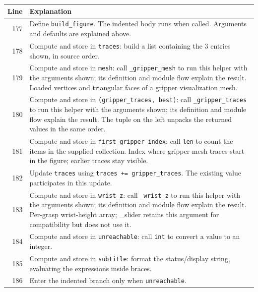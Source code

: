 \documentclass[11pt,a4paper]{book}
\begin{document}
\begin{longtable}{r p{}}

\textbf{Line} & \textbf{Explanation} \\ \hline \endhead

177 & Define \texttt{build\_figure}. The indented body runs when called. Arguments and defaults are explained above. \\

178 & Compute and store in \texttt{traces}: build a list containing the 3 entries shown, in source order.  \\

179 & Compute and store in \texttt{mesh}: call \texttt{\_gripper\_mesh} to run this helper with the arguments shown; its definition and module flow explain the result. Loaded vertices and triangular faces of a gripper visualization mesh. \\

180 & Compute and store in \texttt{(gripper\_traces, best)}: call \texttt{\_gripper\_traces} to run this helper with the arguments shown; its definition and module flow explain the result. The tuple on the left unpacks the returned values in the same order. \\

181 & Compute and store in \texttt{first\_gripper\_index}: call \texttt{len} to count the items in the supplied collection. Index where gripper mesh traces start in the figure; earlier traces stay visible. \\

182 & Update \texttt{traces} using \texttt{traces += gripper\_traces}. The existing value participates in this update. \\

183 & Compute and store in \texttt{wrist\_z}: call \texttt{\_wrist\_z} to run this helper with the arguments shown; its definition and module flow explain the result. Per-grasp wrist-height array; \_slider retains this argument for compatibility but does not use it. \\

184 & Compute and store in \texttt{unreachable}: call \texttt{int} to convert a value to an integer.  \\

185 & Compute and store in \texttt{subtitle}: format the status/display string, evaluating the expressions inside braces.  \\

186 & Enter the indented branch only when \texttt{unreachable}. \\


\end{longtable}
\end{document}

